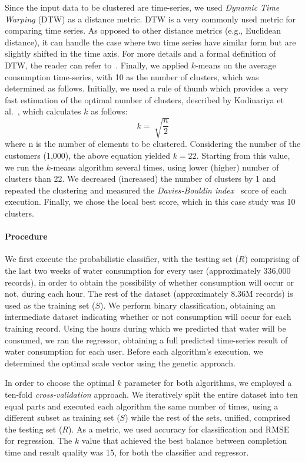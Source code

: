 Since the input data to be clustered are time-series, we used \textit{Dynamic Time Warping} (DTW) as a distance metric. DTW is a very commonly used metric for comparing time series. As opposed to other distance metrics (e.g., Euclidean distance), it can handle the case where two time series have similar form but are slightly shifted in the time axis. For more details and a formal definition of DTW, the reader can refer to~\cite{yi1998efficient}. Finally, we applied $k$-means on the average consumption time-series, with 10 as the number of clusters, which was determined as follows. Initially, we used a rule of thumb which provides a very fast estimation of the optimal number of clusters, described by Kodinariya et al.~\cite{kodinariya2013kmeans}, which calculates $k$ as follows:
\begin{equation}
	k=\sqrt[]{\frac{n}{2}}
\end{equation}
where n is the number of elements to be clustered. Considering the number of the customers (1,000), the above equation yielded $k=22$. Starting from this value, we run the $k$-means algorithm several times, using lower (higher) number of clusters than 22. We decreased (increased) the number of clusters by 1 and repeated the clustering and measured the \textit{Davies-Bouldin index}~\cite{davies1979bouldin} score of each execution. Finally, we chose the local best score, which in this case study was 10 clusters.

\paragraph{Procedure}
\label{par:procedure1}
We first execute the probabilistic classifier, with the testing set ($R$) comprising of the last two weeks of water consumption for every user (approximately 336,000 records), in order to obtain the possibility of whether consumption will occur or not, during each hour. The rest of the dataset (approximately 8.36M records) is used as the training set ($S$). We perform binary classification, obtaining an intermediate dataset indicating whether or not consumption will occur for each training record. Using the hours during which we predicted that water will be consumed, we ran the regressor, obtaining a full predicted time-series result of water consumption for each user. Before each algorithm's execution, we determined the optimal scale vector using the genetic approach.

In order to choose the optimal $k$ parameter for both algorithms, we employed a ten-fold \textit{cross-validation} approach. We iteratively split the entire dataset into ten equal parts and executed each algorithm the same number of times, using a different subset as training set ($S$) while the rest of the sets, unified, comprised the testing set ($R$). As a metric, we used accuracy for classification and RMSE for regression. The $k$ value that achieved the best balance between completion time and result quality was 15, for both the classifier and regressor.

